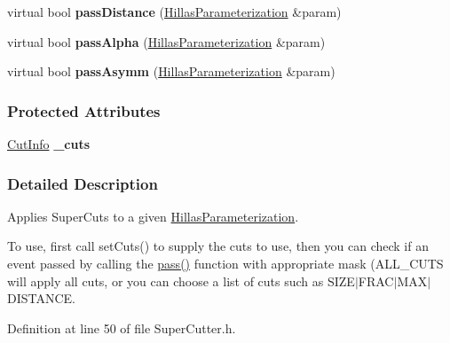 \begin{DoxyCompactItemize}
\item 
\hypertarget{classSuperCutter_aab8883f5d3a6933493f423e16c58a92f}{
virtual bool {\bfseries passDistance} (\hyperlink{structHillasParameterization}{HillasParameterization} \&param)}
\label{classSuperCutter_aab8883f5d3a6933493f423e16c58a92f}

\item 
\hypertarget{classSuperCutter_ad44108cabb56ec9f669d228f925bf13e}{
virtual bool {\bfseries passAlpha} (\hyperlink{structHillasParameterization}{HillasParameterization} \&param)}
\label{classSuperCutter_ad44108cabb56ec9f669d228f925bf13e}

\item 
\hypertarget{classSuperCutter_ae32c936000ba52690c06cb47a2bed21a}{
virtual bool {\bfseries passAsymm} (\hyperlink{structHillasParameterization}{HillasParameterization} \&param)}
\label{classSuperCutter_ae32c936000ba52690c06cb47a2bed21a}

\end{DoxyCompactItemize}
\subsubsection*{Protected Attributes}
\begin{DoxyCompactItemize}
\item 
\hypertarget{classSuperCutter_acd3acee447bab464b3a28fca78f08bab}{
\hyperlink{structCutInfo}{CutInfo} {\bfseries \_\-cuts}}
\label{classSuperCutter_acd3acee447bab464b3a28fca78f08bab}

\end{DoxyCompactItemize}


\subsubsection{Detailed Description}
Applies SuperCuts to a given \hyperlink{structHillasParameterization}{HillasParameterization}. 

To use, first call setCuts() to supply the cuts to use, then you can check if an event passed by calling the \hyperlink{classSuperCutter_a10e29b1d569a2b09755e44c31b3c1e61}{pass()} function with appropriate mask (ALL\_\-CUTS will apply all cuts, or you can choose a list of cuts such as SIZE$|$FRAC$|$MAX$|$DISTANCE. 

Definition at line 50 of file SuperCutter.h.



